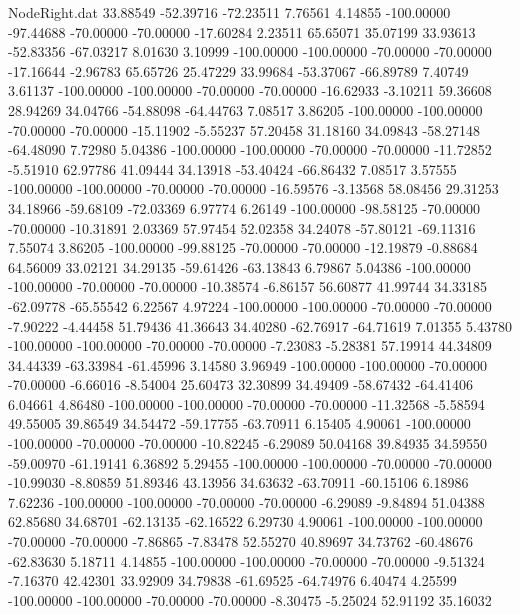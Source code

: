 \begin{filecontents}{NodeRight.dat}
  33.88549  -52.39716  -72.23511     7.76561    4.14855 -100.00000  -97.44688  -70.00000  -70.00000  -17.60284    2.23511   65.65071   35.07199
  33.93613  -52.83356  -67.03217     8.01630    3.10999 -100.00000 -100.00000  -70.00000  -70.00000  -17.16644   -2.96783   65.65726   25.47229
  33.99684  -53.37067  -66.89789     7.40749    3.61137 -100.00000 -100.00000  -70.00000  -70.00000  -16.62933   -3.10211   59.36608   28.94269
  34.04766  -54.88098  -64.44763     7.08517    3.86205 -100.00000 -100.00000  -70.00000  -70.00000  -15.11902   -5.55237   57.20458   31.18160
  34.09843  -58.27148  -64.48090     7.72980    5.04386 -100.00000 -100.00000  -70.00000  -70.00000  -11.72852   -5.51910   62.97786   41.09444
  34.13918  -53.40424  -66.86432     7.08517    3.57555 -100.00000 -100.00000  -70.00000  -70.00000  -16.59576   -3.13568   58.08456   29.31253
  34.18966  -59.68109  -72.03369     6.97774    6.26149 -100.00000  -98.58125  -70.00000  -70.00000  -10.31891    2.03369   57.97454   52.02358
  34.24078  -57.80121  -69.11316     7.55074    3.86205 -100.00000  -99.88125  -70.00000  -70.00000  -12.19879   -0.88684   64.56009   33.02121
  34.29135  -59.61426  -63.13843     6.79867    5.04386 -100.00000 -100.00000  -70.00000  -70.00000  -10.38574   -6.86157   56.60877   41.99744
  34.33185  -62.09778  -65.55542     6.22567    4.97224 -100.00000 -100.00000  -70.00000  -70.00000   -7.90222   -4.44458   51.79436   41.36643
  34.40280  -62.76917  -64.71619     7.01355    5.43780 -100.00000 -100.00000  -70.00000  -70.00000   -7.23083   -5.28381   57.19914   44.34809
  34.44339  -63.33984  -61.45996     3.14580    3.96949 -100.00000 -100.00000  -70.00000  -70.00000   -6.66016   -8.54004   25.60473   32.30899
  34.49409  -58.67432  -64.41406     6.04661    4.86480 -100.00000 -100.00000  -70.00000  -70.00000  -11.32568   -5.58594   49.55005   39.86549
  34.54472  -59.17755  -63.70911     6.15405    4.90061 -100.00000 -100.00000  -70.00000  -70.00000  -10.82245   -6.29089   50.04168   39.84935
  34.59550  -59.00970  -61.19141     6.36892    5.29455 -100.00000 -100.00000  -70.00000  -70.00000  -10.99030   -8.80859   51.89346   43.13956
  34.63632  -63.70911  -60.15106     6.18986    7.62236 -100.00000 -100.00000  -70.00000  -70.00000   -6.29089   -9.84894   51.04388   62.85680
  34.68701  -62.13135  -62.16522     6.29730    4.90061 -100.00000 -100.00000  -70.00000  -70.00000   -7.86865   -7.83478   52.55270   40.89697
  34.73762  -60.48676  -62.83630     5.18711    4.14855 -100.00000 -100.00000  -70.00000  -70.00000   -9.51324   -7.16370   42.42301   33.92909
  34.79838  -61.69525  -64.74976     6.40474    4.25599 -100.00000 -100.00000  -70.00000  -70.00000   -8.30475   -5.25024   52.91192   35.16032

\end{filecontents}

